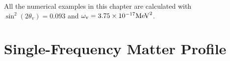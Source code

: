 All the numerical examples in this chapter are calculated with $\sin^2(2\theta_{\mathrm v}) = 0.093$ and $\omega_{\mathrm v} = 3.75\times 10^{-17}\mathrm{MeV}^2$.






\section{\label{chap:matter-sec:single}Single-Frequency Matter Profile}%








